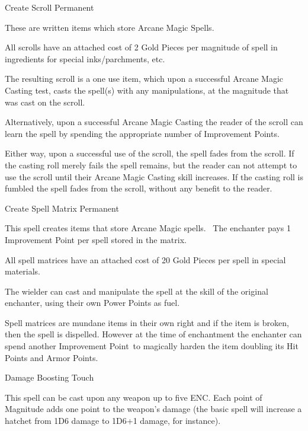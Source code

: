 \begin{rpg-spell}
{Create Scroll}
{Permanent}

These are written items which store Arcane Magic Spells.

All scrolls have an attached cost of 2 Gold Pieces per magnitude of spell in ingredients for special inks/parchments, etc.

The resulting scroll is a one use item, which upon a successful Arcane Magic Casting test, casts the spell(s) with any manipulations, at the magnitude that was cast on the scroll.

Alternatively, upon a successful Arcane Magic Casting the reader of the scroll can learn the spell by spending the appropriate number of Improvement Points.

Either way, upon a successful use of the scroll, the spell fades from the scroll. If the casting roll merely fails the spell remains, but the reader can not attempt to use the scroll until their Arcane Magic Casting skill increases. If the casting roll is fumbled the spell fades from the scroll, without any benefit to the reader.
\end{rpg-spell}


\begin{rpg-spell}
{Create Spell Matrix}
{Permanent}

This spell creates items that store Arcane Magic spells. 
The enchanter pays 1 Improvement Point per spell stored in the matrix.

All spell matrices have an attached cost of 20 Gold Pieces per spell in special materials.

The wielder can cast and manipulate the spell at the skill of the original enchanter, using their own Power Points as fuel.

Spell matrices are mundane items in their own right and if the item is broken, then the spell is dispelled. However at the time of enchantment the enchanter can spend another Improvement Point to magically harden the item doubling its Hit Points and Armor Points.
\end{rpg-spell}

\begin{rpg-spell}
{Damage Boosting}
{Touch}

This spell can be cast upon any weapon up to five ENC. Each point of Magnitude adds one point to the weapon’s damage (the basic spell will increase a hatchet from 1D6 damage to 1D6+1 damage, for instance). 
\end{rpg-spell}


